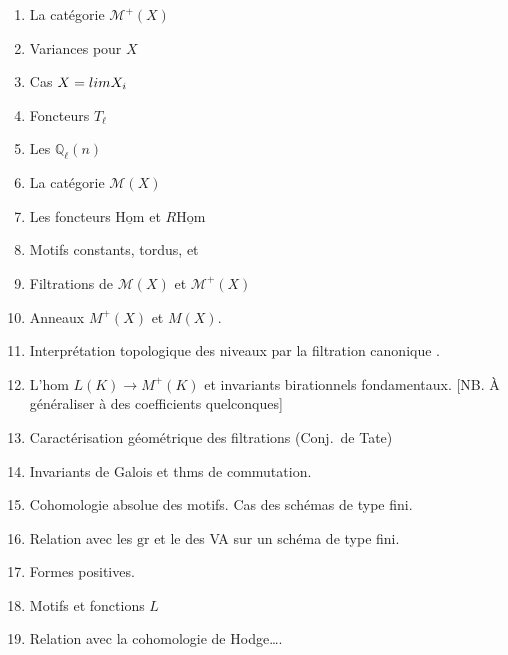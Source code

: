 \documentclass[11pt,a4paper]{article}
\begin{document}
\begin{enumerate}
  \item La catégorie $\mathcal{M}^{+}(X)$
  \item Variances pour $X$
  \item Cas $X = \varprojlim X_{i}$
  \item Foncteurs $T_{\ell}$
  \item Les $\mathbb{Q}_{\ell}(n)$
  \item La catégorie $\mathcal{M}(X)$
  \item Les foncteurs $\underline{\mathrm{Hom}}$ et $R\underline{\mathrm{Hom}}$
  \item Motifs constants, tordus, et 
  \item Filtrations de $\mathcal{M}(X)$ et $\mathcal{M}^{+}(X)$
  \item Anneaux $M^{+}(X)$ et $M(X)$.
  \item Interprétation topologique des \struck{\ill{}} niveaux par la
    filtration canonique \struck{\ill{}} .
  \item L'hom $L(K) \to M^{+}(K)$ et invariants birationnels fondamentaux.
    [NB. À généraliser à des coefficients quelconques]
  \item Caractérisation géométrique des filtrations (Conj.\ de Tate)
  \item Invariants de Galois et thms de commutation.
  \item Cohomologie absolue des motifs. Cas des schémas de type fini.
  \item Relation avec les $\mathrm{gr}$  et le \ill{} des
    VA sur un schéma de type fini.
  \item Formes positives.
  \item Motifs et fonctions $L$
  \item Relation avec la cohomologie de Hodge….
\end{enumerate}
\end{document}
